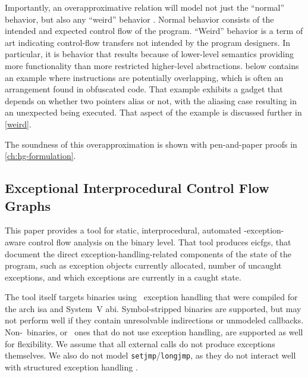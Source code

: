 Importantly, an overapproximative relation will model not just the ``normal'' behavior, but also any ``weird'' behavior \autocite{shapiro2013weird,dullien2017weird}.
Normal behavior consists of the intended and expected control flow of the program.
``Weird'' behavior is a term of art indicating control-flow transfers not intended by the program designers.
In particular, it is behavior that results because of lower-level semantics providing more functionality than more restricted higher-level abstractions.
 below contains an example where instructions are potentially overlapping, which is often an arrangement found in obfuscated code.
That example exhibits a  gadget that depends on whether two pointers alias or not, with the aliasing case resulting in an unexpected  being executed. That aspect of the example is discussed further in \cref{weird}.

The soundness of this overapproximation is shown with pen-and-paper proofs in \cref{ch:hg-formulation}.

\subsection{Exceptional Interprocedural Control Flow Graphs}
This paper provides a tool for static, interprocedural, automated \Cpp-exception-aware control flow analysis on the binary level.
That tool produces \acp{eicfg}, that document the direct exception-handling-related components of the state of the program, such as exception objects currently allocated, number of uncaught exceptions, and which exceptions are currently in a caught state.


The tool itself targets binaries using \Cpp\ exception handling%
that were compiled for the \gls{arch} \ac{isa} and System~V \ac{abi}.
Symbol-stripped binaries are supported, but may not perform well if they contain unresolvable indirections or unmodeled callbacks.
Non-\Cpp\ binaries, or \Cpp\ ones that do not use exception handling, are supported as well for flexibility.
We assume that all external calls do not produce exceptions themselves.
We also do not model \lstinline{setjmp}/\lstinline{longjmp}, as they do not interact well with structured exception handling \autocite{using-setjmp-and-longjmp}.

